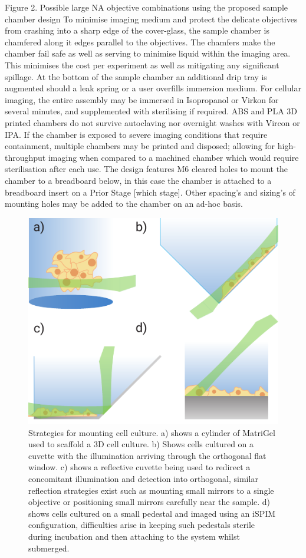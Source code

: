 Figure 2.
Possible large NA objective combinations using the proposed sample chamber design
To minimise imaging medium and protect the delicate objectives from crashing into a sharp edge of the cover-glass, the sample chamber is chamfered along it edges parallel to the objectives.
The chamfers make the chamber fail safe as well as serving to minimise liquid within the imaging area.
This minimises the cost per experiment as well as mitigating any significant spillage.
At the bottom of the sample chamber an additional drip tray is augmented should a leak spring or a user overfills immersion medium.
For cellular imaging, the entire assembly may be immersed in Isopropanol or Virkon for several minutes, and supplemented with sterilising if required.
ABS and PLA 3D printed chambers do not survive autoclaving nor overnight washes with Vircon or IPA.
If the chamber is exposed to severe imaging conditions that require containment, multiple chambers may be printed and disposed; allowing for high-throughput imaging when compared to a machined chamber which would require sterilisation after each use.
The design features M6 cleared holes to mount the chamber to a breadboard below, in this case the chamber is attached to a breadboard insert on a Prior Stage [which stage].
Other spacing’s and sizing’s of mounting holes may be added to the chamber on an ad-hoc basis.

\begin{figure}
    \centering
    \includegraphics{./mounting_straegies_cells}
    \caption{Strategies for mounting cell culture.
    a) shows a cylinder of MatriGel used to scaffold a 3D cell culture.
    b) Shows cells cultured on a cuvette with the illumination arriving through the orthogonal flat window.
    c) shows a reflective cuvette being used to redirect a concomitant illumination and detection into orthogonal, similar reflection strategies exist such as mounting small mirrors to a single objective or positioning small mirrors carefully near the sample.
    d) shows cells cultured on a small pedestal and imaged using an iSPIM configuration, difficulties arise in keeping such pedestals sterile during incubation and then attaching to the system whilst submerged.
    }
    \label{fig:mounting_straegies_cells}
\end{figure}

